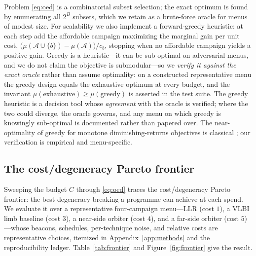 Problem \eqref{eq:oed} is a combinatorial subset selection; the exact optimum is
found by enumerating all $2^B$ subsets, which we retain as a brute-force oracle for
menus of modest size. For scalability we also implement a forward-greedy heuristic:
at each step add the affordable campaign maximizing the marginal gain per unit
cost, $\bigl(\mu(\mathcal{A}\cup\{b\})-\mu(\mathcal{A})\bigr)/c_b$, stopping when no
affordable campaign yields a positive gain. Greedy is a heuristic---it can be
sub-optimal on adversarial menus, and we do not claim the objective is
submodular---so we \emph{verify it against the exact oracle} rather than assume
optimality: on a constructed representative menu the greedy design equals the
exhaustive optimum at every budget, and the invariant
$\mu(\text{exhaustive})\ge\mu(\text{greedy})$ is asserted in the test suite. The
greedy heuristic is a \Modelled{} decision tool whose \emph{agreement} with the
oracle is verified; where the two could diverge, the oracle governs, and any menu
on which greedy is knowingly sub-optimal is documented rather than papered over.
The near-optimality of greedy for monotone diminishing-returns objectives is
classical \citep{nemhauser1978submodular}; our verification is empirical and
menu-specific.

\subsection{The cost/degeneracy Pareto frontier}
\label{sec:frontier}

Sweeping the budget $C$ through \eqref{eq:oed} traces the cost/degeneracy Pareto
frontier: the best degeneracy-breaking a programme can achieve at each spend. We
evaluate it over a representative four-campaign menu---LLR (cost $1$), a VLBI limb
baseline (cost $3$), a near-side orbiter (cost $4$), and a far-side orbiter
(cost $5$)---whose beacons, schedules, per-technique noise, and relative costs are
representative \Modelled{} choices, itemized in Appendix~\ref{app:methods} and the
reproducibility ledger. Table~\ref{tab:frontier} and Figure~\ref{fig:frontier}
give the result.


